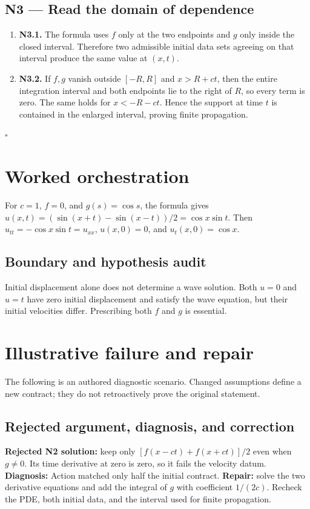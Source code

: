 \documentclass[preprint,12pt,aps,pra,showkeys,amsmath,amssymb,superscriptaddress,floatfix]{revtex4-2}
\theoremstyle{definition}
\theoremstyle{remark}
\begin{document}
\subsection{N3 --- Read the domain of
dependence}\label{n3-read-the-domain-of-dependence}

\begin{enumerate}
\def\labelenumi{\arabic{enumi}.}
\item
  \textbf{N3.1.} The formula uses \(f\) only at the two endpoints and
  \(g\) only inside the closed interval. Therefore two admissible
  initial data sets agreeing on that interval produce the same value at
  \((x,t)\).
\item
  \textbf{N3.2.} If \(f,g\) vanish outside \([-R,R]\) and \(x>R+ct\),
  then the entire integration interval and both endpoints lie to the
  right of \(R\), so every term is zero. The same holds for \(x<-R-ct\).
  Hence the support at time \(t\) is contained in the enlarged interval,
  proving finite propagation.
\end{enumerate}

\hfill$\square$

\section{Worked orchestration}

For \(c=1\), \(f=0\), and \(g(s)=\cos s\), the formula gives
\(u(x,t)=(\sin(x+t)-\sin(x-t))/2=\cos x\sin t\). Then
\(u_{tt}=-\cos x\sin t=u_{xx}\), \(u(x,0)=0\), and \(u_t(x,0)=\cos x\).

\subsection{Boundary and hypothesis audit}

Initial displacement alone does not determine a wave solution. Both
\(u=0\) and \(u=t\) have zero initial displacement and satisfy the wave
equation, but their initial velocities differ. Prescribing both \(f\)
and \(g\) is essential.

\section{Illustrative failure and repair}

The following is an authored diagnostic scenario. Changed assumptions
define a new contract; they do not retroactively prove the original
statement.

\subsection{Rejected argument, diagnosis, and correction}
\textbf{Rejected N2 solution:} keep only \([f(x-ct)+f(x+ct)]/2\) even
when \(g\ne0\). Its time derivative at zero is zero, so it fails the
velocity datum. \textbf{Diagnosis:} Action matched only half the initial
contract. \textbf{Repair:} solve the two derivative equations and add
the integral of \(g\) with coefficient \(1/(2c)\). Recheck the PDE, both
initial data, and the interval used for finite propagation.
\end{document}
